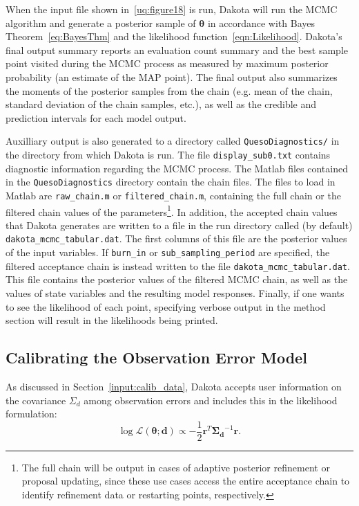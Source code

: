 When the input file shown in~\ref{uq:figure18} is run, Dakota will run
the MCMC algorithm and generate a posterior sample of
$\boldsymbol{\theta}$ in accordance with Bayes
Theorem~\ref{eq:BayesThm} and the likelihood
function~\ref{eqn:Likelihood}. Dakota's final output summary reports
an evaluation count summary and the best sample point visited during
the MCMC process as measured by maximum posterior probability (an
estimate of the MAP point).  The final output also summarizes the
moments of the posterior samples from the chain (e.g.  mean of the
chain, standard deviation of the chain samples, etc.), as well as the
credible and prediction intervals for each model output.

Auxilliary output is also generated to a directory called
\texttt{QuesoDiagnostics/} in the directory from which Dakota is run.
The file \texttt{display\_sub0.txt} contains diagnostic information
regarding the MCMC process.  The Matlab files contained in the
\texttt{QuesoDiagnostics} directory contain the chain files.  The
files to load in Matlab are \texttt{raw\_chain.m} or
\texttt{filtered\_chain.m}, containing the full chain or the filtered
chain values of the parameters\footnote{The full chain will be output
  in cases of adaptive posterior refinement or proposal updating,
  since these use cases access the entire acceptance chain to identify
  refinement data or restarting points, respectively.}.  In addition,
the accepted chain values that Dakota generates are written to a file
in the run directory called (by default)
\texttt{dakota\_mcmc\_tabular.dat}. The first columns of this file are
the posterior values of the input variables. If \texttt{burn\_in} or
\texttt{sub\_sampling\_period} are specified, the filtered acceptance
chain is instead written to the file
\texttt{dakota\_mcmc\_tabular.dat}. This file contains the posterior
values of the filtered MCMC chain, as well as the values of state
variables and the resulting model responses. Finally, if one wants to
see the likelihood of each point, specifying verbose output in the
method section will result in the likelihoods being printed.

\subsection{Calibrating the Observation Error Model}

As discussed in Section~\ref{input:calib_data}, Dakota accepts user
information on the covariance $\Sigma_d$ among observation errors and
includes this in the likelihood formulation:
\begin{equation*}
\log{\mathcal{L}(\boldsymbol{{\theta};d})} \propto %
-\frac{1}{2} \boldsymbol{r}^T \boldsymbol{\Sigma_d}^{-1} \boldsymbol{r}.
\end{equation*}

